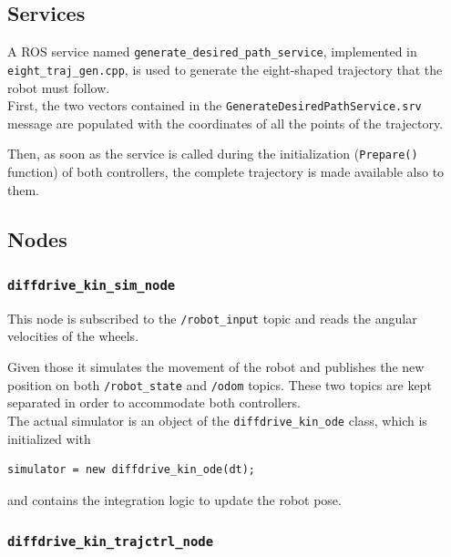 \documentclass[11pt,a4paper]{article}
\begin{document}
\subsection{Services}

A ROS service named \texttt{generate\_desired\_path\_service}, implemented in \texttt{eight\_traj\_gen.cpp}, is used to generate the eight-shaped
trajectory that the robot must follow.\\

First, the two vectors contained in the \texttt{GenerateDesiredPathService.srv} message are populated
with the coordinates of all the points of the trajectory.

Then, as soon as the service is called during the initialization (\texttt{Prepare()} function) of both
controllers, the complete trajectory is made available also to them.



\subsection{Nodes}

\subsubsection{\texttt{diffdrive\_kin\_sim\_node}}

This node is subscribed to the \texttt{/robot\_input} topic and reads the angular velocities
of the wheels.

Given those it simulates the movement of the robot and publishes the new position on both
\texttt{/robot\_state} and \texttt{/odom} topics.
These two topics are kept separated in order to accommodate both controllers.\\

The actual simulator is an object of the \texttt{diffdrive\_kin\_ode} class, which is initialized with
\begin{lstlisting}
simulator = new diffdrive_kin_ode(dt);
\end{lstlisting}

and contains the integration logic to update the robot pose.

\subsubsection{\texttt{diffdrive\_kin\_trajctrl\_node}}
\end{document}
